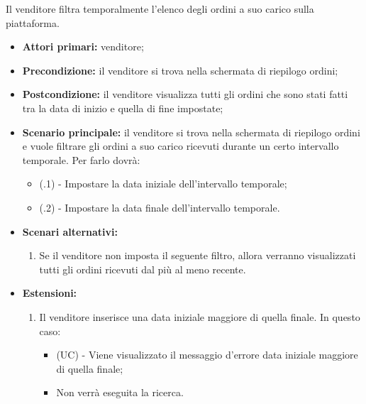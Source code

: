 Il venditore filtra temporalmente l'elenco degli ordini a suo carico sulla piattaforma.
\begin{itemize}
	\item \textbf{Attori primari:} venditore;
	\item \textbf{Precondizione:} il venditore si trova nella schermata di riepilogo ordini;
	\item \textbf{Postcondizione:} il venditore visualizza tutti gli ordini che sono stati fatti tra la data di inizio e quella di fine impostate;
	\item \textbf{Scenario principale:} il venditore si trova nella schermata di riepilogo ordini e vuole filtrare gli ordini a suo carico ricevuti durante un certo intervallo temporale. Per farlo dovrà:
	\begin{itemize}
		\item (\actualSubUC.1) - Impostare la data iniziale dell'intervallo temporale;
		\item (\actualSubUC.2) - Impostare la data finale dell'intervallo temporale.
	\end{itemize}
		\item \textbf{Scenari alternativi:}
	\begin{enumerate}[label=\lett]
		\item Se il venditore non imposta il seguente filtro, allora verranno visualizzati tutti gli ordini ricevuti dal più al meno recente.
	\end{enumerate}
	\item \textbf{Estensioni:}
	\begin{enumerate}[label=\lett]
		\item Il venditore inserisce una data iniziale maggiore di quella finale. In questo caso:
		\begin{itemize}
			\item (UC) - Viene visualizzato il messaggio d'errore data iniziale maggiore di quella finale;
			\item Non verrà eseguita la ricerca.
		\end{itemize}
	\end{enumerate}
\end{itemize}

